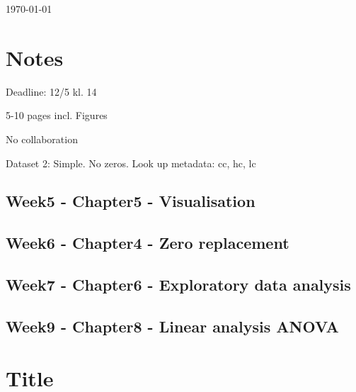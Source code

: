 \documentclass{article}
\begin{document}
\today
\tableofcontents
























\newpage{}

\section{Notes}

Deadline: 12/5 kl. 14

5-10 pages incl. Figures

No collaboration


Dataset 2: Simple. No zeros. Look up metadata: cc, hc, lc \newline


 
\subsection{Week5 - Chapter5 - Visualisation} 
\subsection{Week6 - Chapter4 - Zero replacement} 
\subsection{Week7 - Chapter6 - Exploratory data analysis } 
\subsection{Week9 - Chapter8 - Linear analysis ANOVA} 


\section{Title}
\end{document}
